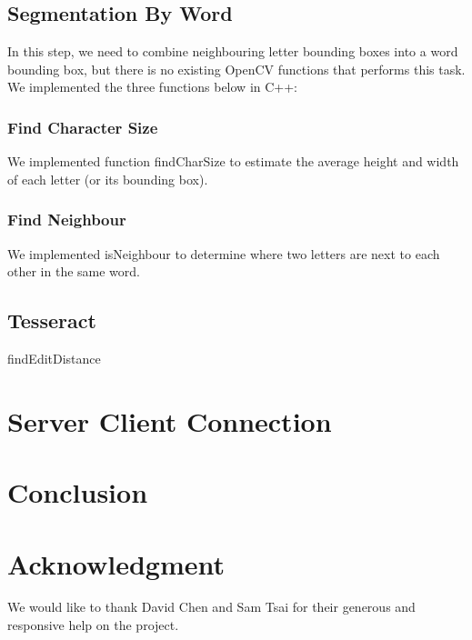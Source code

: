\documentclass[conference]{IEEEtran}
\begin{document}
\subsection{Segmentation By Word}

In this step, we need to combine neighbouring letter bounding boxes into a word bounding box, but there is no existing OpenCV functions that performs this task.  We implemented the three functions below in C++:

\subsubsection{Find Character Size}
We implemented function findCharSize to estimate the average height and width of each letter (or its bounding box).  

\subsubsection{Find Neighbour}
We implemented isNeighbour to determine where two letters are next to each other in the same word.

\subsection{Tesseract}
findEditDistance

\section{Server Client Connection}

\section{Conclusion}

\section*{Acknowledgment}
We would like to thank David Chen and Sam Tsai for their generous and responsive help on the project.


\end{document}
